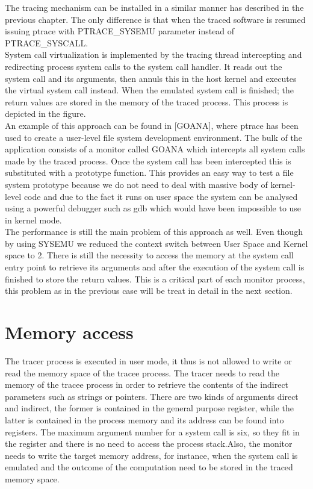 The tracing mechanism can be installed in a similar manner has described in the previous chapter. The only difference is that when the traced software is resumed issuing ptrace with PTRACE\_SYSEMU parameter instead of PTRACE\_SYSCALL.  \\
System call virtualization is implemented by the tracing thread intercepting and redirecting process system calls to the system call handler.  It reads out the system call and its arguments, then annuls this in the host kernel and executes the virtual system call instead. When the emulated system call is finished; the return values are stored in the memory of the traced process.
This process is depicted in the figure. \\
An example of this approach can be found in [GOANA], where ptrace has been used to create a user-level file system development environment.  The bulk of the application consists of a monitor called GOANA which intercepts all system calls made by the traced process. Once the system call has been intercepted this is substituted with a prototype function.  This provides an easy way to test a file system prototype because we do not need to deal with massive body of kernel-level code and  due to the fact it runs on user space the system can be analysed using a powerful debugger such as gdb which would have been impossible to use in kernel mode. \\
The performance is still the main problem of this approach as well.   Even though by using SYSEMU we reduced the context switch between User Space and Kernel space to 2. There is still the necessity   to access the memory at the system call entry point to retrieve its arguments and after the execution of the system call is finished to store the return values. This is a critical part of each monitor process, this problem as in the previous case will be treat in detail in the next section. \\


\section{Memory access}
\label{memory_access}
The tracer process is executed in user mode, it thus is not allowed to write or read the memory space of the tracee process. The tracer needs to read the memory of the tracee process in order to retrieve the contents of the indirect parameters such as strings or pointers.
There are two kinds of arguments direct and indirect, the former is contained in the general purpose register, while the latter is contained in the process memory and its address can be found into registers. The maximum argument number for a system call is six, so they fit in the register and there is no need to access the process stack.Also, the monitor needs to write the target memory address, for instance, when the system call is emulated and the outcome of the computation need to be stored in the traced memory space.

